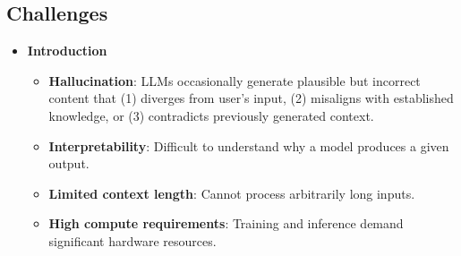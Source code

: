 \documentclass[UTF8]{ctexart}
\begin{document}
\subsection{Challenges}
\begin{itemize}
    \item \textbf{Introduction}
    \begin{itemize}
        \item \textbf{Hallucination}: LLMs occasionally generate plausible but incorrect content that (1) diverges from user's input, (2) misaligns with established knowledge, or (3) contradicts previously generated context.
        \item \textbf{Interpretability}: Difficult to understand why a model produces a given output.
        \item \textbf{Limited context length}: Cannot process arbitrarily long inputs.
        \item \textbf{High compute requirements}: Training and inference demand significant hardware resources.
    \end{itemize}


\end{itemize}
\end{document}
